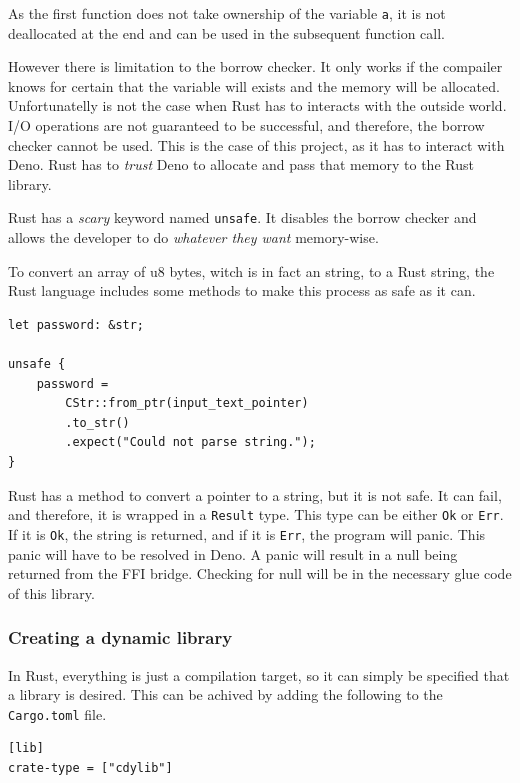 \documentclass[10pt,journal,compsoc]{IEEEtran}
\begin{document}
As the first function does not take ownership of the variable \verb|a|, it is not deallocated at the end and can be used in the subsequent function call.

However there is limitation to the borrow checker. It only works if the compailer knows for certain that the variable will exists and the memory will be allocated. Unfortunatelly is not the case when Rust has to interacts with the outside world. I/O operations are not guaranteed to be successful, and therefore, the borrow checker cannot be used. This is the case of this project, as it has to interact with Deno. Rust has to \textit{trust} Deno to allocate and pass that memory to the Rust library.

Rust has a \textit{scary} keyword named \verb|unsafe|. It disables the borrow checker and allows the developer to do \textit{whatever they want} memory-wise.

To convert an array of u8 bytes, witch is in fact an string, to a Rust string, the Rust language includes some methods to make this process as safe as it can.

\begin{lstlisting}
let password: &str;

unsafe {
    password = 
        CStr::from_ptr(input_text_pointer)
        .to_str()
        .expect("Could not parse string.");
}
\end{lstlisting}

Rust has a method to convert a pointer to a string, but it is not safe. It can fail, and therefore, it is wrapped in a \verb|Result| type. This type can be either \verb|Ok| or \verb|Err|. If it is \verb|Ok|, the string is returned, and if it is \verb|Err|, the program will panic. This panic will have to be resolved in Deno. A panic will result in a null being returned from the FFI bridge. Checking for null will be in the necessary glue code of this library.

\subsubsection{Creating a dynamic library}

In Rust, everything is just a compilation target, so it can simply be specified that a library is desired. This can be achived by adding the following to the \verb|Cargo.toml| file.

\begin{lstlisting}
[lib]
crate-type = ["cdylib"]
\end{lstlisting}
\end{document}
